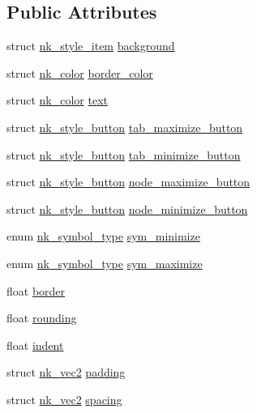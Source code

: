 \subsection*{Public Attributes}
\begin{DoxyCompactItemize}
\item 
struct \mbox{\hyperlink{structnk__style__item}{nk\+\_\+style\+\_\+item}} \mbox{\hyperlink{structnk__style__tab_a9f751874249b6e1a1d35a5e87eb95bda}{background}}
\item 
struct \mbox{\hyperlink{structnk__color}{nk\+\_\+color}} \mbox{\hyperlink{structnk__style__tab_ae28051d435a882753fd267fef0637903}{border\+\_\+color}}
\item 
struct \mbox{\hyperlink{structnk__color}{nk\+\_\+color}} \mbox{\hyperlink{structnk__style__tab_ad39a9118e595989bfe330ab5aad673a5}{text}}
\item 
struct \mbox{\hyperlink{structnk__style__button}{nk\+\_\+style\+\_\+button}} \mbox{\hyperlink{structnk__style__tab_a249d7729ae42ddeb8a7791e359d05c19}{tab\+\_\+maximize\+\_\+button}}
\item 
struct \mbox{\hyperlink{structnk__style__button}{nk\+\_\+style\+\_\+button}} \mbox{\hyperlink{structnk__style__tab_a1b7600272b1e49296d89e68fb993cae2}{tab\+\_\+minimize\+\_\+button}}
\item 
struct \mbox{\hyperlink{structnk__style__button}{nk\+\_\+style\+\_\+button}} \mbox{\hyperlink{structnk__style__tab_a1148fc1c2ba4fc697619e27a480469a8}{node\+\_\+maximize\+\_\+button}}
\item 
struct \mbox{\hyperlink{structnk__style__button}{nk\+\_\+style\+\_\+button}} \mbox{\hyperlink{structnk__style__tab_aacb1b9a6300f86ffdcb4f8cf90a344d2}{node\+\_\+minimize\+\_\+button}}
\item 
enum \mbox{\hyperlink{nuklear_8h_a29b4aaa400d0ce28aea3c8c9c372ac07}{nk\+\_\+symbol\+\_\+type}} \mbox{\hyperlink{structnk__style__tab_a50977cd5e3328ce1bed6e7a7abaf7855}{sym\+\_\+minimize}}
\item 
enum \mbox{\hyperlink{nuklear_8h_a29b4aaa400d0ce28aea3c8c9c372ac07}{nk\+\_\+symbol\+\_\+type}} \mbox{\hyperlink{structnk__style__tab_a55e66550b450cf00499636997b6e9c19}{sym\+\_\+maximize}}
\item 
float \mbox{\hyperlink{structnk__style__tab_a5fd25a46147bd54d7700563c2860d1e8}{border}}
\item 
float \mbox{\hyperlink{structnk__style__tab_abf1cfda005f683974f5ab213c5513ea3}{rounding}}
\item 
float \mbox{\hyperlink{structnk__style__tab_a535cb708f61a9cba5ee581ab044b8f71}{indent}}
\item 
struct \mbox{\hyperlink{structnk__vec2}{nk\+\_\+vec2}} \mbox{\hyperlink{structnk__style__tab_ae7f4a7d0f21e33ecc0bf892902d012ad}{padding}}
\item 
struct \mbox{\hyperlink{structnk__vec2}{nk\+\_\+vec2}} \mbox{\hyperlink{structnk__style__tab_acbaac49087d16fd6e755a125c4c23c84}{spacing}}
\end{DoxyCompactItemize}


